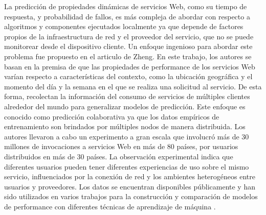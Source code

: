 La predicción de propiedades dinámicas de servicios Web, como su tiempo
de respuesta, y probabilidad de fallos, es más compleja de abordar
con respecto a algoritmos y componentes ejecutados localmente ya que
depende de factores propios de la infraestructura de red y el proveedor
del servicio, que no se puede monitorear desde el dispositivo cliente.
Un enfoque ingenioso para abordar este problema fue propuesto en el
articulo de Zheng\citep{Zheng2013}. En este trabajo, los autores
se basan en la premisa de que las propiedades de performance de los
servicios Web varían respecto a características del contexto, como
la ubicación geográfica y el momento del día y la semana en el que
se realiza una solicitud al servicio. De esta forma, recolectan la
información del consumo de servicios de múltiples clientes alrededor
del mundo para generalizar modelos de predicción. Este enfoque es
conocido como predicción colaborativa ya que los datos empíricos de
entrenamiento son brindados por múltiples nodos de manera distribuida.
Los autores llevaron a cabo un experimento a gran escala que involucró
más de 30 millones de invocaciones a servicios Web en más de 80 países,
por usuarios distribuidos en más de 30 países. La observación experimental
indica que diferentes usuarios pueden tener diferentes experiencias
de uso sobre el mismo servicio, influenciados por la conexión de red
y los ambientes heterogéneos entre usuarios y proveedores. Los datos
se encuentran disponibles públicamente y han sido utilizados en varios
trabajos para la construcción y comparación de modelos de performance
con diferentes técnicas de aprendizaje de máquina \citep{Albu2013}\citep{Kumar2015}. 
